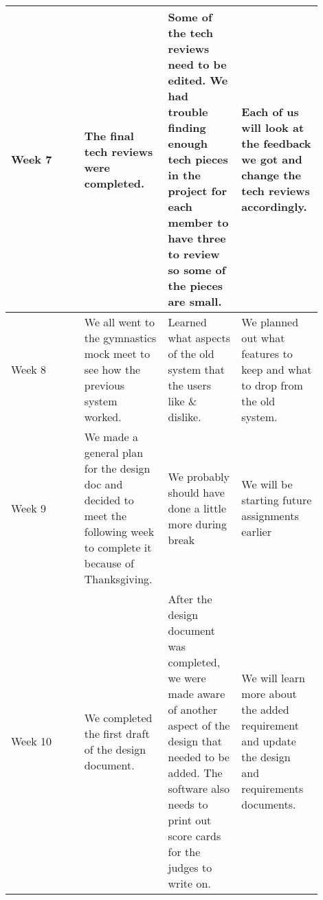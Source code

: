 \documentclass[letterpaper,10pt,draftclsnofoot,onecolumn,]{article}
\begin{document}
\begin{longtable}{ | p{0.225\linewidth} | p{0.225\linewidth} | p{0.225\linewidth} | p{0.225\linewidth} | }
    Week 7 & The final tech reviews were completed. & Some of the tech reviews need to be edited. We had trouble finding enough tech pieces in the project for each member to have three to review so some of the pieces are small. & Each of us will look at the feedback we got and change the tech reviews accordingly. \\
    \hline
    Week 8 & We all went to the gymnastics mock meet to see how the previous system worked. & Learned what aspects of the old system that the users like \& dislike. & We planned out what features to keep and what to drop from the old system. \\
    \hline
    Week 9 & We made a general plan for the design doc and decided to meet the following week to complete it because of Thanksgiving.& We probably should have done a little more during break & We will be starting future assignments earlier\\
    \hline
    Week 10 & We completed the first draft of the design document. & After the design document was completed, we were made aware of another aspect of the design that needed to be added. The software also needs to print out score cards for the judges to write on. & We will learn more about the added requirement and update the design and requirements documents. \\
    \hline
    
\end{longtable}
\end{document}
